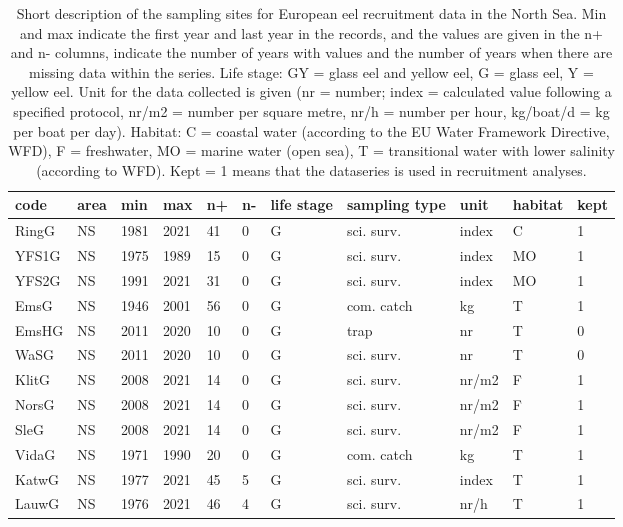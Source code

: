 \begin{table}[ht]
\centering
\caption{Short description of the sampling sites for European eel recruitment data in the North Sea. Min and max indicate the first year and last year in the records, and the values are given in the n+ and n- columns, indicate the number of years with values and the number of years when there are missing data within the series. Life stage: GY = glass eel and yellow eel, G = glass eel, Y = yellow eel. Unit for the data collected is given (nr = number; index = calculated value following a specified protocol, nr/m2 = number per square metre, nr/h = number per hour, kg/boat/d = kg per boat per day). Habitat: C = coastal water (according to the EU Water Framework Directive, WFD), F = freshwater, MO = marine water (open sea), T = transitional water with lower salinity (according to WFD). Kept = 1 means that the dataseries is used in recruitment analyses.} 
\label{statseriesG}
\begin{tabular}{p{1cm}p{1cm}p{1cm}p{1cm}p{0.8cm}p{0.8cm}p{1cm}p{2cm}p{2cm}p{1cm}p{1cm}}
  \hline
code & area & min & max & n+ & n- & life stage & sampling type & unit & habitat & kept \\ 
  \hline
RingG & NS & 1981 & 2021 & 41 & 0 & G & sci. surv. & index & C & 1 \\ 
  YFS1G & NS & 1975 & 1989 & 15 & 0 & G & sci. surv. & index & MO & 1 \\ 
  YFS2G & NS & 1991 & 2021 & 31 & 0 & G & sci. surv. & index & MO & 1 \\ 
  EmsG & NS & 1946 & 2001 & 56 & 0 & G & com. catch & kg & T & 1 \\ 
  EmsHG & NS & 2011 & 2020 & 10 & 0 & G & trap & nr & T & 0 \\ 
  WaSG & NS & 2011 & 2020 & 10 & 0 & G & sci. surv. & nr & T & 0 \\ 
  KlitG & NS & 2008 & 2021 & 14 & 0 & G & sci. surv. & nr/m2 & F & 1 \\ 
  NorsG & NS & 2008 & 2021 & 14 & 0 & G & sci. surv. & nr/m2 & F & 1 \\ 
  SleG & NS & 2008 & 2021 & 14 & 0 & G & sci. surv. & nr/m2 & F & 1 \\ 
  VidaG & NS & 1971 & 1990 & 20 & 0 & G & com. catch & kg & T & 1 \\ 
  KatwG & NS & 1977 & 2021 & 45 & 5 & G & sci. surv. & index & T & 1 \\ 
  LauwG & NS & 1976 & 2021 & 46 & 4 & G & sci. surv. & nr/h & T & 1 \\ 

\end{tabular}
\end{table}
